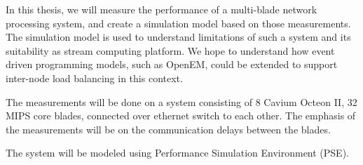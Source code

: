In this thesis, we will measure the performance of a multi-blade network processing system, and create a simulation model based on those measurements. The simulation model is used to understand limitations of such a system and its suitability as stream computing platform. We hope to understand how event driven programming models, such as OpenEM, could be extended to support inter-node load balancing in this context.

The measurements will be done on a system consisting of 8 Cavium Octeon II, 32 MIPS core blades, connected over ethernet switch to each other. The emphasis of the measurements will be on the communication delays between the blades.

The system will be modeled using Performance Simulation Environment (PSE).


